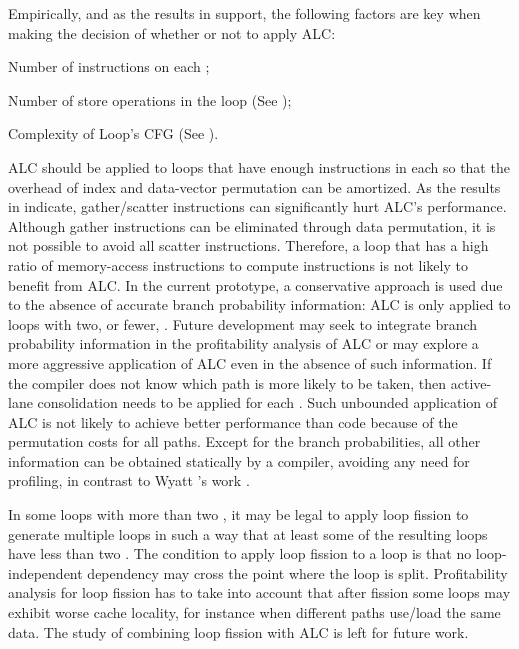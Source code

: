 Empirically, and as the results in  support, the following factors are key when making the decision of whether or not to apply ALC:
\begin{inparaenum}
    \item Number of instructions on each \cpath;
    \item Number of store operations in the loop (See );
    \item Complexity of Loop's CFG (See ).
\end{inparaenum}
ALC should be applied to loops that have enough instructions in each \cpath so that the overhead of index and data-vector permutation can be amortized.
As the results in  indicate, gather/scatter instructions can significantly hurt ALC's performance.
Although gather instructions can be eliminated through data permutation, it is not possible to avoid all scatter instructions.
Therefore, a loop that has a high ratio of memory-access instructions to compute instructions is not likely to benefit from ALC.
In the current prototype, a conservative approach is used due to the absence of accurate branch probability information: ALC is only applied to loops with two, or fewer, \cpaths.
Future development may seek to integrate branch probability information in the profitability analysis of ALC or may explore a more aggressive application of ALC even in the absence of such information.
If the compiler does not know which path is more likely to be taken, then active-lane consolidation needs to be applied for each \cpath.
Such unbounded application of ALC is not likely to achieve better performance than \ifconverted code because of the permutation costs for all paths. 
Except for the branch probabilities, all other information can be obtained statically by a compiler, avoiding any need for profiling, in contrast to Wyatt \etal's work \cite{praharenka_vectorizing_2022}.

In some loops with more than two \cpaths, it may be legal to apply loop fission to generate multiple loops in such a way that at least some of the resulting loops have less than two \cpaths.
The condition to apply loop fission to a loop is that no loop-independent dependency may cross the point where the loop is split.
Profitability analysis for loop fission has to take into account that after fission some loops may exhibit worse cache locality, for instance when different paths use/load the same data.
The study of combining loop fission with ALC is left for future work.

